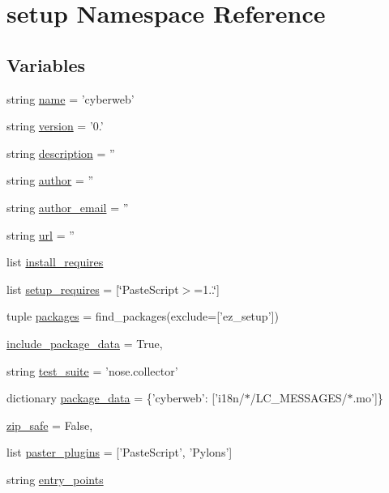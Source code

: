 \hypertarget{namespacesetup}{\section{setup \-Namespace \-Reference}
\label{namespacesetup}
}
\subsection*{\-Variables}
\begin{DoxyCompactItemize}
\item 
string \hyperlink{namespacesetup_a4b28e5b21e957c451ff3aa28f58c6383}{name} = 'cyberweb'
\item 
string \hyperlink{namespacesetup_a8b86ddd5b5591d99de08e584197a53d9}{version} = '0.'
\item 
string \hyperlink{namespacesetup_a4ad612547892c74be7035043265eb65c}{description} = ''
\item 
string \hyperlink{namespacesetup_a7b92894168460f935bc49467954c4a92}{author} = ''
\item 
string \hyperlink{namespacesetup_a4ead8e1ca45242906fde7d5489f3beaa}{author\-\_\-email} = ''
\item 
string \hyperlink{namespacesetup_a7c3763764f99123690822c047e74c36e}{url} = ''
\item 
list \hyperlink{namespacesetup_a85dad60316171523a8538c5f6dd764c3}{install\-\_\-requires}
\item 
list \hyperlink{namespacesetup_a4cbca0f0be6073ce5c6dbbebeaa76ecf}{setup\-\_\-requires} = \mbox{[}\char`\"{}\-Paste\-Script$>$=1..\char`\"{}\mbox{]}
\item 
tuple \hyperlink{namespacesetup_a61c4df0a151113447498726d453324de}{packages} = find\-\_\-packages(exclude=\mbox{[}'ez\-\_\-setup'\mbox{]})
\item 
\hyperlink{namespacesetup_a6548d07bffe2114176be01447602d0e3}{include\-\_\-package\-\_\-data} = \-True,
\item 
string \hyperlink{namespacesetup_a0e55c2e28d112353d7b057e7ca1374a9}{test\-\_\-suite} = 'nose.\-collector'
\item 
dictionary \hyperlink{namespacesetup_a9564b88d698a28beb160196680de9e7d}{package\-\_\-data} = \{'cyberweb'\-: \mbox{[}'i18n/$\ast$/\-L\-C\-\_\-\-M\-E\-S\-S\-A\-G\-E\-S/$\ast$.mo'\mbox{]}\}
\item 
\hyperlink{namespacesetup_a57f4177a567efe80153e32033b6cca09}{zip\-\_\-safe} = \-False,
\item 
list \hyperlink{namespacesetup_ac19e4f19d366d12c2c857064aeafa0e7}{paster\-\_\-plugins} = \mbox{[}'\-Paste\-Script', '\-Pylons'\mbox{]}
\item 
string \hyperlink{namespacesetup_a2fe64cb9ade3932eb490b30dc5758d50}{entry\-\_\-points}
\end{DoxyCompactItemize}


